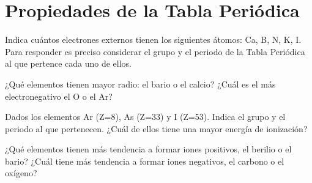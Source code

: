 \section{Propiedades de la Tabla Periódica}

\begin{prob}
Indica cuántos electrones externos tienen los siguientes átomos: Ca, B, N, K, I.
Para responder es preciso considerar el grupo y el periodo de la Tabla Periódica al que pertence
cada uno de ellos. 
\end{prob}


\begin{prob}
¿Qué elementos tienen mayor radio: el bario o el calcio? ¿Cuál es el más electronegativo el O o el Ar?
\end{prob}


\begin{prob}
Dados los elementos Ar (Z=8), As (Z=33) y I (Z=53). Indica el grupo y el periodo al que pertenecen.
¿Cuál de ellos tiene una mayor energía de ionización? 
\end{prob}


\begin{prob}
¿Qué elementos tienen más tendencia a formar iones positivos, el berilio o el bario?
¿Cuál tiene más tendencia a formar iones negativos, el carbono o el oxígeno?
\end{prob}
